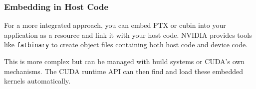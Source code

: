 \subsubsection{Embedding in Host Code}

For a more integrated approach, you can embed PTX or cubin into your application as a resource and link it with your host code. NVIDIA provides tools like \texttt{fatbinary} to create object files containing both host code and device code.

This is more complex but can be managed with build systems or CUDA's own mechanisms. The CUDA runtime API can then find and load these embedded kernels automatically.



